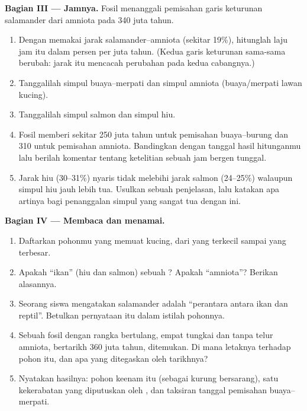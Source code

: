 \begin{problem}
\medskip
\noindent\textbf{Bagian III --- Jamnya.}
Fosil menanggali pemisahan garis keturunan salamander dari amniota
pada 340 juta tahun.
\begin{enumerate}[resume]
  \item Dengan memakai jarak salamander--amniota (sekitar 19\%),
        hitunglah laju jam itu dalam persen per juta tahun. (Kedua
        garis keturunan sama-sama berubah: jarak itu mencacah
        perubahan pada kedua cabangnya.)
  \item Tanggalilah simpul buaya--merpati dan simpul amniota
        (buaya/merpati lawan kucing).
  \item Tanggalilah simpul salmon dan simpul hiu.
  \item Fosil memberi sekitar 250 juta tahun untuk pemisahan
        buaya--burung dan 310 untuk pemisahan amniota. Bandingkan
        dengan tanggal hasil hitunganmu lalu berilah komentar tentang
        ketelitian sebuah jam bergen tunggal.
  \item Jarak hiu (30--31\%) nyaris tidak melebihi jarak salmon
        (24--25\%) walaupun simpul hiu jauh lebih tua. Usulkan sebuah
        penjelasan, lalu katakan apa artinya bagi penanggalan simpul
        yang sangat tua dengan  ini.
\end{enumerate}

\medskip
\noindent\textbf{Bagian IV --- Membaca dan menamai.}
\begin{enumerate}[resume]
  \item Daftarkan  pohonmu yang memuat kucing, dari yang terkecil
        sampai yang terbesar.
  \item Apakah ``ikan'' (hiu dan salmon) sebuah ? Apakah
        ``amniota''? Berikan alasannya.
  \item Seorang siswa mengatakan salamander adalah ``perantara antara
        ikan dan reptil''. Betulkan pernyataan itu dalam istilah
        pohonnya.
  \item Sebuah fosil dengan rangka bertulang, empat tungkai dan tanpa
        telur amniota, bertarikh 360 juta tahun, ditemukan. Di mana
        letaknya terhadap pohon itu, dan apa yang ditegaskan oleh
        tarikhnya?
  \item Nyatakan hasilnya: pohon keenam  itu (sebagai kurung
        bersarang), satu kekerabatan yang diputuskan oleh , dan
        taksiran tanggal pemisahan buaya--merpati.
\end{enumerate}
\end{problem}
